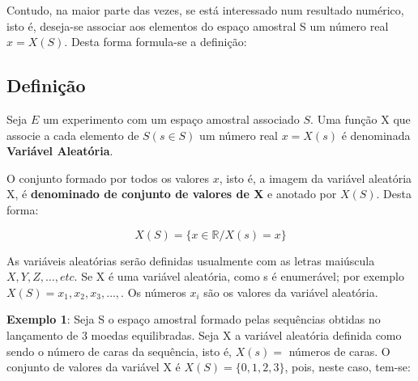 \par Contudo, na maior parte das vezes, se está interessado num
resultado numérico, isto é, deseja-se associar aos elementos do
espaço amostral S um número real $x=X(S)$. Desta forma formula-se
a definição:\vskip0.3cm

\subsection{Definição}

Seja $E$ um experimento com um espaço amostral associado $S$. Uma
função X que associe a cada elemento de $S(s \in S)$ um número
real $x=X(s)$ é denominada \textbf{Variável Aleatória}.\vskip0.3cm

\par O conjunto formado por todos os valores $x$, isto é, a imagem
da variável aleatória X, é \textbf{denominado de conjunto de
valores de X} e anotado por $X(S)$. Desta forma:

\begin{equation}
    X(S) = \{ x \in \mathbb{R}/X(s)=x  \}
\end{equation}




As variáveis aleatórias serão definidas usualmente com as letras
maiúscula $X, Y, Z, \ldots, etc$. Se X é uma variável aleatória,
como s é enumerável; por exemplo
$X(S)={x_{1},x_{2},x_{3},\ldots,}$. Os números $x_{i}$ são os
valores da variável aleatória.\vskip0.3cm

\textbf{Exemplo 1}: Seja S o espaço amostral formado pelas
sequências obtidas no lançamento de 3 moedas equilibradas. Seja X
a variável aleatória definida como sendo o número de caras da
sequência, isto é, $X(s)=$ números de caras. O conjunto de
valores da variável X é $X(S)=\{0,1,2,3\}$, pois, neste caso,
tem-se:

\begin{table}[!htb]
\end{table}



